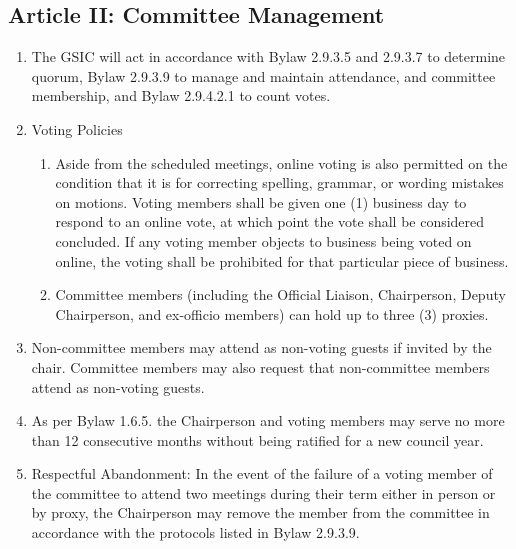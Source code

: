 \subsection{Article II: Committee Management}
\begin{enumerate}[label*=\arabic*., align=left]	
\item The GSIC will act in accordance with Bylaw 2.9.3.5 and 2.9.3.7 to determine quorum, Bylaw 2.9.3.9 to manage and maintain attendance, and committee membership, and Bylaw 2.9.4.2.1 to count votes.
\item Voting Policies
\begin{enumerate}[label*=\arabic*., align=left]	
\item Aside from the scheduled meetings, online voting is also permitted on the condition that it is for correcting spelling, grammar, or wording mistakes on motions. Voting members shall be given one (1) business day to respond to an online vote, at which point the vote shall be considered concluded. If any voting member objects to business being voted on online, the voting shall be prohibited for that particular piece of business.
\item Committee members (including the Official Liaison, Chairperson, Deputy Chairperson, and ex-officio members) can hold up to three (3) proxies.
\end{enumerate}
\item Non-committee members may attend as non-voting guests if invited by the chair. Committee members may also request that non-committee members attend as non-voting guests.
\item As per Bylaw 1.6.5. the Chairperson and voting members may serve no more than 12 consecutive months without being ratified for a new council year.
\item Respectful Abandonment: In the event of the failure of a voting member of the committee to attend two meetings during their term either in person or by proxy, the Chairperson may remove the member from the committee in accordance with the protocols listed in Bylaw 2.9.3.9.
\end{enumerate}

